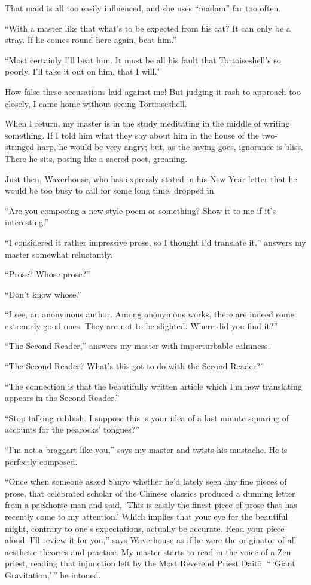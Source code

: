 \documentclass[12pt, openright]{book}
\begin{document}
That maid is all too easily influenced, and she uses ``madam'' far too
often.

``With a master like that what's to be expected from his cat? It can
only be a stray. If he comes round here again, beat him.''

``Most certainly I'll beat him. It must be all his fault that
Tortoiseshell's so poorly. I'll take it out on him, that I will.''

How false these accusations laid against me! But judging it rash to
approach too closely, I came home without seeing Tortoiseshell.

When I return, my master is in the study meditating in the middle of
writing something. If I told him what they say about him in the house of
the two-stringed harp, he would be very angry; but, as the saying goes,
ignorance is bliss. There he sits, posing like a sacred poet, groaning.

Just then, Waverhouse, who has expressly stated in his New Year letter
that he would be too busy to call for some long time, dropped in.

``Are you composing a new-style poem or something? Show it to me if it's
interesting.''

``I considered it rather impressive prose, so I thought I'd translate
it,'' answers my master somewhat reluctantly.

``Prose? Whose prose?''

``Don't know whose.''

``I see, an anonymous author. Among anonymous works, there are indeed
some extremely good ones. They are not to be slighted. Where did you
find it?''

``The Second Reader,'' answers my master with imperturbable calmness.

``The Second Reader? What's this got to do with the Second Reader?''

``The connection is that the beautifully written article which I'm now
translating appears in the Second Reader.''

``Stop talking rubbish. I suppose this is your idea of a last minute
squaring of accounts for the peacocks' tongues?''

``I'm not a braggart like you,'' says my master and twists his mustache.
He is perfectly composed.

``Once when someone asked Sanyo whether he'd lately seen any fine pieces
of prose, that celebrated scholar of the Chinese classics produced a
dunning letter from a packhorse man and said, `This is easily the finest
piece of prose that has recently come to my attention.' Which implies
that your eye for the beautiful might, contrary to one's expectations,
actually be accurate. Read your piece aloud. I'll review it for you,''
says Waverhouse as if he were the originator of all aesthetic theories
and practice. My master starts to read in the voice of a Zen priest,
reading that injunction left by the Most Reverend Priest Daitō.
``\,`Giant Gravitation,'\,'' he intoned.
\end{document}
